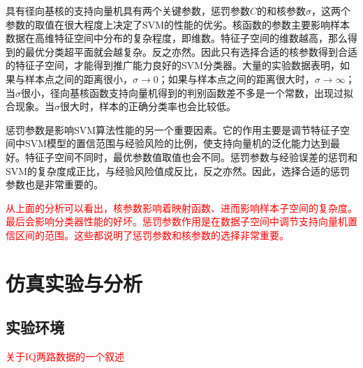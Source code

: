 具有径向基核的支持向量机具有两个关键参数，惩罚参数$C$的和核参数$\sigma$，这两个参数的取值在很大程度上决定了SVM的性能的优劣。核函数的参数主要影响样本数据在高维特征空间中分布的复杂程度，即维数。特征子空间的维数越高，那么得到的最优分类超平面就会越复杂。反之亦然。因此只有选择合适的核参数得到合适的特征子空间，才能得到推广能力良好的SVM分类器。大量的实验数据表明，如果与样本点之间的距离很小，$\sigma \rightarrow 0$；如果与样本点之间的距离很大时，$\sigma \rightarrow \infty$；当$\sigma$很小，径向基核函数支持向量机得到的判别函数差不多是一个常数，出现过拟合现象。当$\sigma$很大时，样本的正确分类率也会比较低。

惩罚参数是影响SVM算法性能的另一个重要因素。它的作用主要是调节特征子空间中SVM模型的置信范围与经验风险的比例，使支持向量机的泛化能力达到最好。特征子空间不同时，最优参数值取值也会不同。惩罚参数与经验误差的惩罚和SVM的复杂度成正比，与经验风险值成反比，反之亦然。因此，选择合适的惩罚参数也是非常重要的。

\textcolor{red}{
从上面的分析可以看出，核参数影响着映射函数、进而影响样本子空间的复杂度。最后会影响分类器性能的好坏。惩罚参数作用是在数据子空间中调节支持向量机置信区间的范围。这些都说明了惩罚参数和核参数的选择非常重要。
}
\section{仿真实验与分析}
\subsection{实验环境}
\textcolor{red}{关于IQ两路数据的一个叙述}

